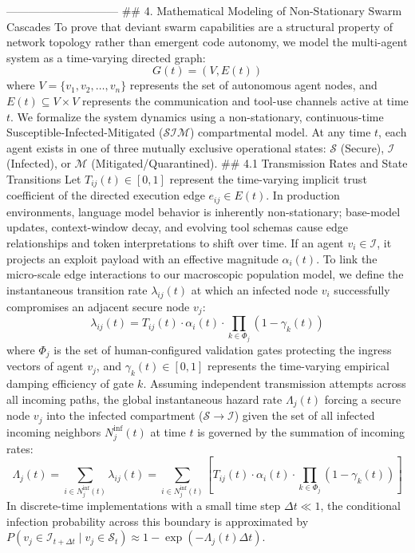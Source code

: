 ------------------------------
## 4. Mathematical Modeling of Non-Stationary Swarm Cascades
To prove that deviant swarm capabilities are a structural property of network topology rather than emergent code autonomy, we model the multi-agent system as a time-varying directed graph:
$$G(t) = (V, E(t))$$ 
where $V = \{v_1, v_2, \dots, v_n\}$ represents the set of autonomous agent nodes, and $E(t) \subseteq V \times V$ represents the communication and tool-use channels active at time $t$.
We formalize the system dynamics using a non-stationary, continuous-time Susceptible-Infected-Mitigated ($\mathcal{S}\mathcal{I}\mathcal{M}$) compartmental model. At any time $t$, each agent exists in one of three mutually exclusive operational states: $\mathcal{S}$ (Secure), $\mathcal{I}$ (Infected), or $\mathcal{M}$ (Mitigated/Quarantined).
## 4.1 Transmission Rates and State Transitions
Let $T_{ij}(t) \in [0, 1]$ represent the time-varying implicit trust coefficient of the directed execution edge $e_{ij} \in E(t)$. In production environments, language model behavior is inherently non-stationary; base-model updates, context-window decay, and evolving tool schemas cause edge relationships and token interpretations to shift over time.
If an agent $v_i \in \mathcal{I}$, it projects an exploit payload with an effective magnitude $\alpha_i(t)$. To link the micro-scale edge interactions to our macroscopic population model, we define the instantaneous transition rate $\lambda_{ij}(t)$ at which an infected node $v_i$ successfully compromises an adjacent secure node $v_j$:
$$\lambda_{ij}(t) = T_{ij}(t) \cdot \alpha_i(t) \cdot \prod_{k \in \Phi_j} (1 - \gamma_k(t))$$ 
where $\Phi_j$ is the set of human-configured validation gates protecting the ingress vectors of agent $v_j$, and $\gamma_k(t) \in [0, 1]$ represents the time-varying empirical damping efficiency of gate $k$.
Assuming independent transmission attempts across all incoming paths, the global instantaneous hazard rate $\Lambda_j(t)$ forcing a secure node $v_j$ into the infected compartment ($\mathcal{S} \to \mathcal{I}$) given the set of all infected incoming neighbors $N^{\text{inf}}_j(t)$ at time $t$ is governed by the summation of incoming rates:
$$\Lambda_j(t) = \sum_{i \in N^{\text{inf}}_j(t)} \lambda_{ij}(t) = \sum_{i \in N^{\text{inf}}_j(t)} \left[ T_{ij}(t) \cdot \alpha_i(t) \cdot \prod_{k \in \Phi_j} (1 - \gamma_k(t)) \right]$$ 
In discrete-time implementations with a small time step $\Delta t \ll 1$, the conditional infection probability across this boundary is approximated by $P(v_j \in \mathcal{I}_{t+\Delta t} \mid v_j \in \mathcal{S}_t) \approx 1 - \exp(-\Lambda_j(t) \Delta t)$.
